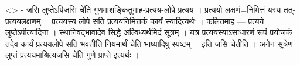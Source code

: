 \textless{}\textgreater{} - जसि लुप्तेऽपिजसि चे॑ति
गुणमाशङ्कितुमाह-प्रत्यय-लोपे प्रत्यय । प्रत्ययो लक्षणं=निमित्तं यस्य
तत्-प्रत्ययलक्षणम् । प्रत्ययस्य लोपे सति प्रत्ययनिमित्तकं कार्यं
स्यादित्यर्थः । फलितमाह --- प्रत्यये लुप्तेऽपीत्यादिना ।
स्थानिवद्भावादेव सिद्धे अल्विध्यर्थमिदं सूत्रम् । यत्र
प्रत्ययस्याऽसाधारणं रूपं प्रयोजकं तदेव कार्यं प्रत्ययलोपे सति भवतीति
नियमार्थं चेति भाष्यादिषु स्पष्टम् । इति जसि चेतीति । अनेन सूत्रेण
लुप्तं प्रत्ययमाश्रित्यजसि चे॑ति गुणे प्राप्ते इत्यर्थः ।
